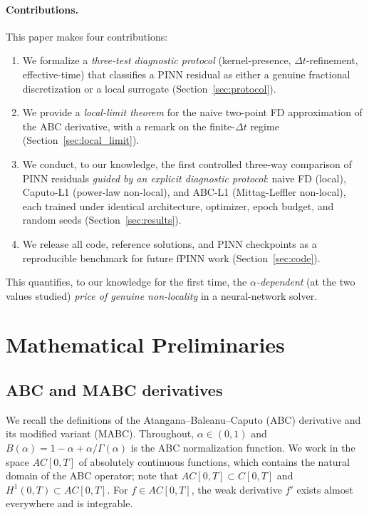 \documentclass[11pt]{article}
\begin{document}
\paragraph{Contributions.}
This paper makes four contributions:
\begin{enumerate}[label=(\roman*)]
\item We formalize a \emph{three-test diagnostic protocol} (kernel-presence, \(\Delta t\)-refinement, effective-time) that classifies a PINN residual as either a genuine fractional discretization or a local surrogate (Section~\ref{sec:protocol}).
\item We provide a \emph{local-limit theorem} for the naive two-point FD approximation of the ABC derivative, with a remark on the finite-\(\Delta t\) regime (Section~\ref{sec:local_limit}).
\item We conduct, to our knowledge, the first controlled three-way comparison of PINN residuals \emph{guided by an explicit diagnostic protocol}: naive FD (local), Caputo-L1 (power-law non-local), and ABC-L1 (Mittag-Leffler non-local), each trained under identical architecture, optimizer, epoch budget, and random seeds (Section~\ref{sec:results}).
\item We release all code, reference solutions, and PINN checkpoints as a reproducible benchmark for future fPINN work (Section~\ref{sec:code}).
\end{enumerate}

This quantifies, to our knowledge for the first time, the \emph{\(\alpha\)-dependent} (at the two values studied) \emph{price of genuine non-locality} in a neural-network solver.

\section{Mathematical Preliminaries}
\label{sec:prelim}

\subsection{ABC and MABC derivatives}
\label{sec:abc}

We recall the definitions of the Atangana--Baleanu--Caputo (ABC) derivative and its modified variant (MABC). Throughout, \(\alpha \in (0,1)\) and \(B(\alpha) = 1-\alpha+\alpha/\Gamma(\alpha)\) is the ABC normalization function. We work in the space \(AC[0,T]\) of absolutely continuous functions, which contains the natural domain of the ABC operator; note that \(AC[0,T] \subset C[0,T]\) and \(H^1(0,T) \subset AC[0,T]\). For \(f \in AC[0,T]\), the weak derivative \(f'\) exists almost everywhere and is integrable.
\end{document}
